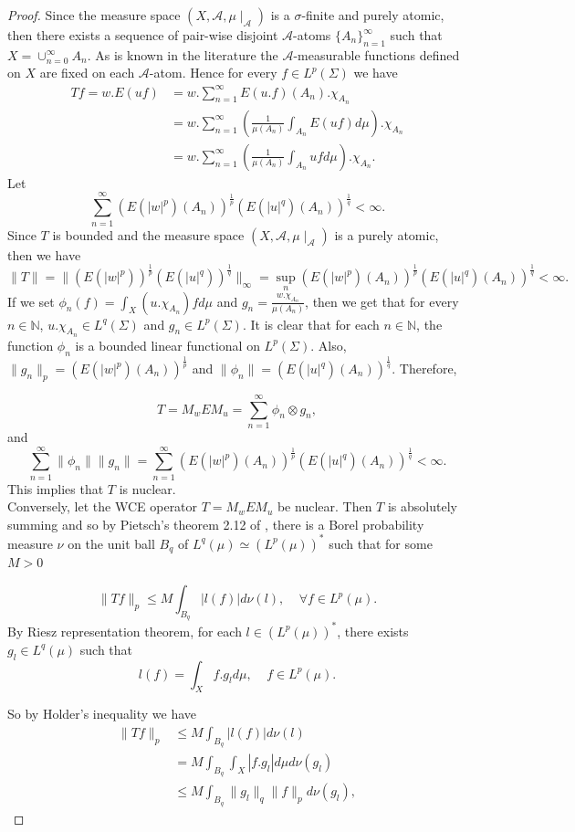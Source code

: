 \documentclass{amsart}
\theoremstyle{definition}\newtheorem{defn}[thm]{Definition}
\theoremstyle{remark}
\numberwithin{equation}{section}
\begin{document}
\begin{proof} Since the measure space $(X, \mathcal{A}, \mu\mid_{\mathcal{A}})$ is a $\sigma$-finite and purely atomic, then there exists a sequence of pair-wise disjoint $\mathcal{A}$-atoms $\{A_n\}^{\infty}_{n=1}$ such that $X=\cup^{\infty}_{n=0}A_n$. As is known in the literature the $\mathcal{A}$-measurable functions defined on $X$ are fixed on each $\mathcal{A}$-atom. Hence for every $f\in L^p(\Sigma)$ we have
\begin{align*}
Tf=w.E(uf)&=w.\sum_{n=1}^{\infty}E(u.f)(A_n).\chi_{A_n}\\
&=w.\sum_{n=1}^{\infty}\left(\frac{1}{\mu(A_n)}\int_{A_n}E(uf)d\mu\right).\chi_{A_n}\\
&=w.\sum_{n=1}^{\infty}\left(\frac{1}{\mu(A_n)}\int_{A_n}ufd\mu\right).\chi_{A_n}.
\end{align*}
Let $$\sum^{\infty}_{n=1}(E(|w|^{p})(A_n))^{\frac{1}{p}}(E(|u|^{q})(A_n))^{\frac{1}{q}}<\infty.$$
 Since $T$ is bounded and the measure space $(X, \mathcal{A}, \mu\mid_{\mathcal{A}})$ is a purely atomic, then we have
$$\|T\|=\|(E(|w|^{p}))^{\frac{1}{p}}(E(|u|^{q}))^{\frac{1}{q}}\|_{\infty}=\sup_{n}(E(|w|^{p})(A_n))^{\frac{1}{p}}(E(|u|^{q})(A_n))^{\frac{1}{q}}<\infty.$$
If we set $\phi_n(f)=\int_X(u.\chi_{A_n})fd\mu$ and $g_n=\frac{w.\chi_{A_n}}{\mu(A_n)}$, then we get that for every $n\in \mathbb{N}$, $u.\chi_{A_n}\in L^{q}(\Sigma)$ and  $g_n\in L^{p}(\Sigma)$. It is clear that for each $n\in \mathbb{N}$, the function $\phi_n$ is a bounded linear functional on $L^p(\Sigma)$. Also, $\|g_n\|_p=(E(|w|^p)(A_n))^{\frac{1}{p}}$ and $\|\phi_n\|=(E(|u|^{q})(A_n))^{\frac{1}{q}}$. Therefore,

$$T=M_wEM_u=\sum_{n=1}^{\infty}\phi_n\otimes g_n,$$
and
$$\sum_{n=1}^{\infty}\|\phi_n\|\|g_n\|=\sum^{\infty}_{n=1}(E(|w|^{p})(A_n))^{\frac{1}{p}}(E(|u|^{q})(A_n))^{\frac{1}{q}}<\infty.$$
This implies that $T$ is nuclear.\\

Conversely, let the WCE operator $T=M_wEM_u$ be nuclear. Then $T$ is absolutely summing and so by Pietsch’s  theorem 2.12 of \cite{die}, there is a Borel probability measure $\nu$ on the unit ball $B_q$ of $L^q(\mu)\simeq(L^p(\mu))^*$ such that for some $M>0$

$$\|Tf\|_p\leq M\int_{B_q}|l(f)|d\nu(l), \ \ \ \ \ \forall f\in L^p(\mu).$$
By Riesz representation theorem, for each $l\in (L^p(\mu))^*$, there exists $g_l\in L^q(\mu)$ such that
  $$l(f)=\int_Xf.g_l d\mu, \ \ \ \ \ f\in L^p(\mu).$$
  
So by Holder's inequality we have 
\begin{align*}
\|Tf\|_p&\leq M\int_{B_q}|l(f)|d\nu(l)\\
&=M\int_{B_q}\int_X|f.g_l| d\mu d\nu(g_l)\\
&\leq M\int_{B_q}\|g_l\|_q\|f\|_pd\nu(g_l),
\end{align*}
 

\end{proof}
\end{document}
